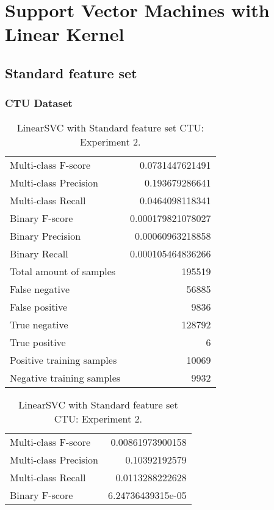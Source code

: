 
\chapter{Support Vector Machines with Linear Kernel} %

\section{Standard feature set}
\subsection{CTU Dataset}

\begin{table}[H]
\begin{minipage}{0.5\textwidth}
\caption{LinearSVC with Standard feature set CTU: Experiment 1.}
\centering
\begin{tabular}{l r}
\toprule
Multi-class F-score & 0.0731447621491 \\
Multi-class Precision & 0.193679286641 \\
Multi-class Recall & 0.0464098118341 \\
\midrule
Binary F-score & 0.000179821078027 \\
Binary Precision & 0.00060963218858 \\
Binary Recall & 0.000105464836266 \\
\midrule
Total amount of samples & 195519 \\
False negative & 56885 \\
False positive & 9836 \\
True negative & 128792 \\
True positive & 6 \\
\midrule
Positive training samples & 10069 \\
Negative training samples & 9932 \\
\bottomrule
\end{tabular}
\end{minipage}
\hfillx
\begin{minipage}{0.5\textwidth}
\caption{LinearSVC with Standard feature set CTU: Experiment 2.}
\centering
\begin{tabular}{l r}
\toprule
Multi-class F-score & 0.00861973900158 \\
Multi-class Precision & 0.10392192579 \\
Multi-class Recall & 0.0113288222628 \\
\midrule
Binary F-score & 6.24736439315e-05 \\

\end{tabular}
\end{minipage}
\end{table}
